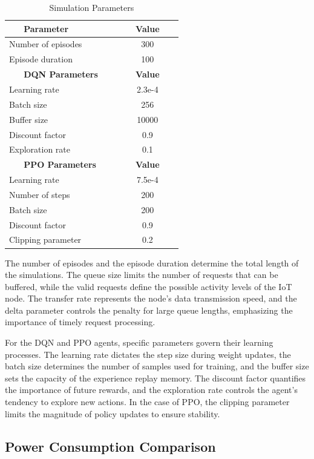\documentclass[11pt,a4paper]{article}
\begin{document}
\begin{table}[t]
\centering
\caption{Simulation Parameters}
\label{tab:parameters}
\begin{tabular}{|l|c|}
\hline
\textbf{~~~Parameter~~~} & \textbf{~~~Value~~~} \\
\hline
Number of episodes & 300 \\
Episode duration & 100 \\
\hline
\textbf{~~~DQN Parameters~~~} & \textbf{~~~Value~~~} \\
\hline
Learning rate & 2.3e-4 \\
Batch size & 256 \\
Buffer size & 10000 \\
Discount factor & 0.9 \\
Exploration rate & 0.1 \\ 
\hline
\textbf{~~~PPO Parameters~~~} & \textbf{~~~Value~~~} \\
\hline
Learning rate & 7.5e-4 \\
Number of steps & 200 \\
Batch size & 200 \\
Discount factor & 0.9 \\
Clipping parameter & 0.2 \\
\hline
\end{tabular}
\end{table}

The number of episodes and the episode duration determine the total length of the simulations. The queue size limits the number of requests that can be buffered, while the valid requests define the possible activity levels of the IoT node. The transfer rate represents the node's data transmission speed, and the delta parameter controls the penalty for large queue lengths, emphasizing the importance of timely request processing.

For the DQN and PPO agents, specific parameters govern their learning processes. The learning rate dictates the step size during weight updates, the batch size determines the number of samples used for training, and the buffer size sets the capacity of the experience replay memory. The discount factor quantifies the importance of future rewards, and the exploration rate controls the agent's tendency to explore new actions. In the case of PPO, the clipping parameter limits the magnitude of policy updates to ensure stability. 

\subsection{Power Consumption Comparison}
\end{document}
